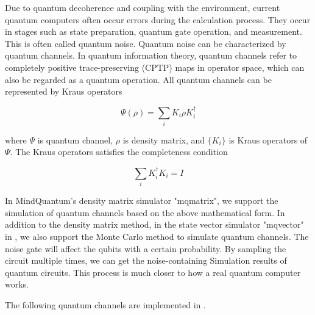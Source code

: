 \label{sec:noise_simulation}
Due to quantum decoherence and coupling with the environment, current quantum computers often occur errors during the calculation process. They occur in stages such as state preparation, quantum gate operation, and measurement. This is often called quantum noise. Quantum noise can be characterized by quantum channels. In quantum information theory, quantum channels refer to completely positive trace-preserving (CPTP) maps in operator space, which can also be regarded as a quantum operation. All quantum channels can be represented by Kraus operators

\begin{equation}
    \Psi(\rho) = \sum_i K_i \rho K_i^\dagger
\end{equation}

where $\Psi$ is quantum channel, $\rho$ is density matrix, and $\{K_i\}$ is Kraus operators of $\Psi$. The Kraus operators satisfies the completeness condition

\begin{equation}
    \sum_i K_i^\dagger K_i = I
\end{equation}

In MindQuantum's density matrix simulator "mqmatrix", we support the simulation of quantum channels based on the above mathematical form. In addition to the density matrix method, in the state vector simulator "mqvector" in \MindQuantum, we also support the Monte Carlo method to simulate quantum channels. The noise gate will affect the qubits with a certain probability. By sampling the circuit multiple times, we can get the noise-containing Simulation results of quantum circuits. This process is much closer to how a real quantum computer works.

The following quantum channels are implemented in \MindQuantum.

